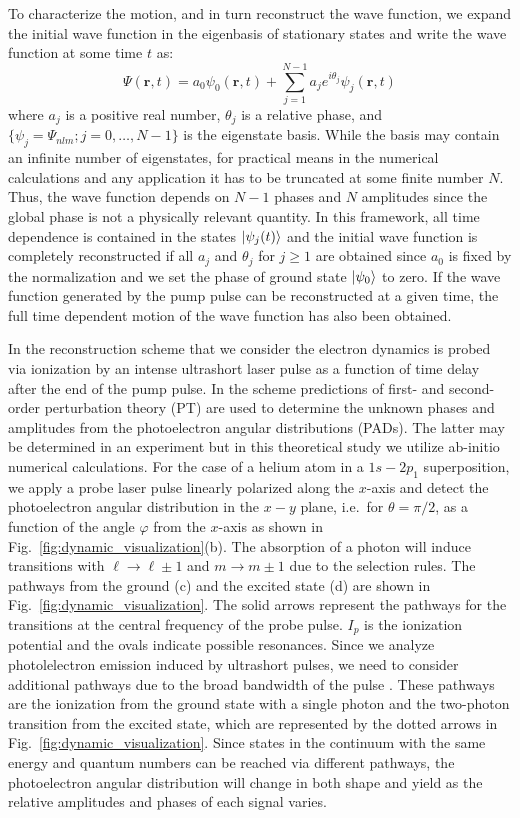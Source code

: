 To characterize the motion, and in turn reconstruct the wave function, we expand the initial wave function in the eigenbasis of stationary states and write the wave function at some time $t$ as: 
%
\begin{equation}
    \Psi({\bm r},t) = a_0 \psi_0({\bm r},t) + \sum_{j=1}^{N-1} a_j e^{i\theta_j} \psi_j({\bm r},t)
    \label{eq:expansion}
\end{equation}
%
where $a_j$ is a positive real number, $\theta_j $ is a relative phase, and $\{ \psi_j = \Psi_{nlm}; j = 0, \ldots, N-1\}$ is the eigenstate basis. While the basis may contain an infinite number of eigenstates, for practical means in the numerical calculations and any application it has to be truncated at some finite number $N$. Thus, the wave function depends on $N-1$ phases and $N$ amplitudes since the global phase is not a physically relevant quantity. In this framework, all time dependence is contained in the states $\ket{\psi_j(t)}$ and the initial wave function is completely reconstructed if all $a_j$ and $\theta_j$ for $j\geq 1$ are obtained since $a_0$ is fixed by the normalization and we set the phase of ground state $\ket{\psi_0}$ to zero. If the wave function generated by the pump pulse can be reconstructed at a given time, the full time dependent motion of the wave function has also been obtained.

In the reconstruction scheme that we consider the electron dynamics is probed via ionization by an intense ultrashort laser pulse as a function of time delay  after the end of the pump pulse. In the scheme predictions of first- and second-order perturbation theory (PT) are used to determine the unknown phases and amplitudes from the photoelectron angular distributions (PADs). The latter may be determined in an experiment but in this theoretical study we utilize ab-initio numerical calculations. For the case of a helium atom in a $1s-2p_1$ superposition, we apply a probe laser pulse linearly polarized along the $x$-axis and detect the photoelectron angular distribution in the $x-y$ plane, i.e.\ for $\theta = \pi/2$, as a function of the angle $\varphi$ from the $x$-axis as shown in Fig.~\ref{fig:dynamic_visualization}(b). The absorption of a photon will induce transitions with $\ell \rightarrow \ell \pm 1$ and $m \rightarrow m \pm 1$ due to the selection rules. The pathways from the ground (c) and the excited state (d) are shown in Fig.\ \ref{fig:dynamic_visualization}. The solid arrows represent the pathways for the transitions at the central frequency of the probe pulse. $I_p$ is the ionization potential and the ovals indicate possible resonances. Since we analyze photolelectron emission induced by ultrashort pulses, we need to consider additional pathways due to the broad bandwidth of the pulse \cite{venzke2020_ionization}. These pathways are the ionization from the ground state with a single photon and the two-photon transition from the excited state, which are represented by the dotted arrows in Fig.~\ref{fig:dynamic_visualization}. Since states in the continuum with the same energy and quantum numbers can be reached via different pathways, the photoelectron angular distribution will change in both shape and yield as the relative amplitudes and phases of each signal varies.


